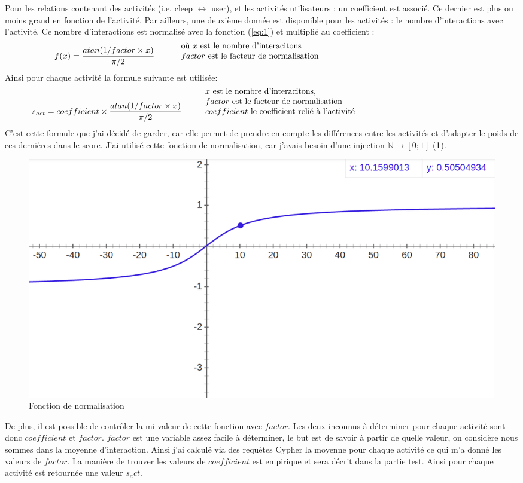 \documentclass{article} %
\begin{document}
Pour les relations contenant des activités (i.e. cleep $\leftrightarrow$ user), et les activités utilisateurs : un coefficient est associé. Ce dernier est plus ou moins grand en fonction de l'activité. Par ailleurs, une deuxième donnée est disponible pour les activités : le nombre d'interactions avec l'activité. Ce nombre d'interactions est normalisé avec la fonction (\ref{eq:1}) et multiplié au coefficient :
\begin{equation}
\label{eq:1}
f(x) = \frac{atan(1/factor \times x)}{\pi/2} \hspace{1cm} \mbox{ \vbox{\noindent où $x$ est le nombre d'interacitons \\$factor$ est le facteur de normalisation }}
\end{equation}
Ainsi pour chaque activité la formule suivante est utilisée:
\begin{equation}
\label{eq:2}
s_{act} = coefficient\times\frac{atan(1/factor \times x)}{\pi/2} \hspace{1cm} \mbox{\vbox{\noindent $x$ est le nombre d'interacitons, \\$factor$ est le facteur de  normalisation \\ $coefficient$ le coefficient relié à l'activité}} 
\end{equation}
C'est cette formule que j'ai décidé de garder, car elle permet de prendre en compte les différences entre les activités et d'adapter le poids de ces dernières dans le score. J'ai utilisé cette fonction de normalisation, car j'avais besoin d'une injection $\mathbb{N} \rightarrow [0;1]$ (\textbf{\ref{fig:atan}}). 
\begin{figure}[!h]
 \centering
 \includegraphics[keepaspectratio = true,scale=0.3]{atan.png}
 \caption{Fonction de normalisation}
 \label{fig:atan}
\end{figure}

De plus, il est possible de contrôler la mi-valeur de cette fonction avec $factor$. Les deux inconnus à déterminer pour chaque activité sont donc $coefficient$ et $factor$. $factor$ est une variable assez facile à déterminer, le but est de savoir à partir de quelle valeur, on considère nous sommes dans la moyenne d'interaction. Ainsi j'ai calculé via des requêtes Cypher la moyenne pour chaque activité ce qui m'a donné les valeurs de $factor$. La manière de trouver les valeurs de $coefficient$ est empirique et sera décrit dans la partie test. Ainsi pour chaque activité est retournée une valeur $s_act$.\\
\end{document}
